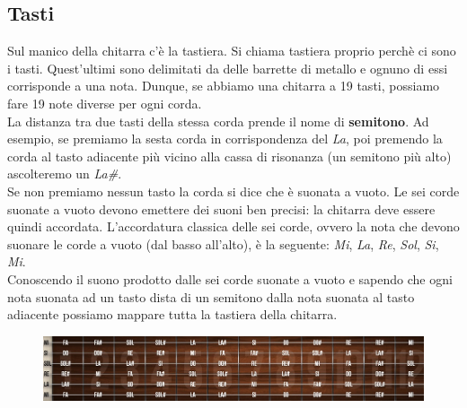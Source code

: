 \subsection{Tasti}
Sul manico della chitarra c’è la tastiera. Si chiama tastiera proprio perchè ci sono i tasti. Quest'ultimi sono delimitati da delle barrette di metallo e ognuno di essi corrisponde a una nota. Dunque, se abbiamo una chitarra a 19 tasti, possiamo fare 19 note diverse per ogni corda.\\
La distanza tra due tasti della stessa corda prende il nome di \textbf{semitono}. Ad esempio, se premiamo la sesta corda in corrispondenza del \textit{La}, poi premendo la corda al tasto adiacente più vicino alla cassa di risonanza (un semitono più alto) ascolteremo un \textit{La\#}.\\
Se non premiamo nessun tasto la corda si dice che è suonata a vuoto. Le sei corde suonate a vuoto devono emettere dei suoni ben precisi: la chitarra deve essere quindi accordata. L'accordatura classica delle sei corde, ovvero la nota che devono suonare le corde a vuoto (dal basso all'alto), è la seguente: \textit{Mi}, \textit{La}, \textit{Re}, \textit{Sol}, \textit{Si}, \textit{Mi}.\\
Conoscendo il suono prodotto dalle sei corde suonate a vuoto e sapendo che ogni nota suonata ad un tasto dista di un semitono dalla nota suonata al tasto adiacente possiamo mappare tutta la tastiera della chitarra.
\begin{figure}[H]
	\centering
	\includegraphics[scale=0.60]{./images/img13.jpg}
\end{figure}

